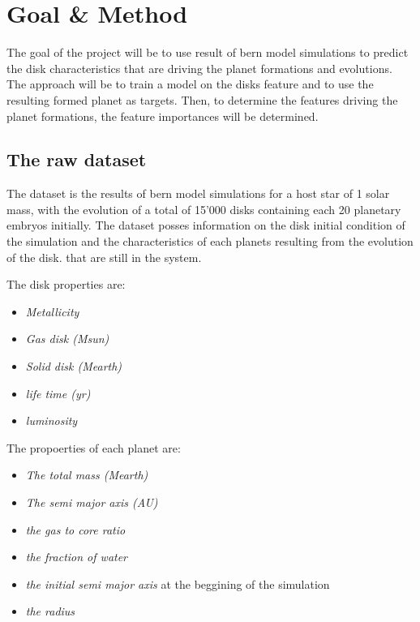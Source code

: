 \documentclass[a4paper, 11pt]{article}
\begin{document}
    \section{Goal \& Method}
    
    The goal of the project will be to use result of bern model simulations  to predict the disk characteristics that are driving the planet formations and evolutions. The approach will be to train a model on the disks feature and to use the resulting formed planet as targets. Then, to determine the features driving the planet formations, the feature importances will be determined.
    
    \subsection{The raw dataset}
    The dataset is the results of bern model simulations for a host star of 1 solar mass, with the evolution of a total of 15'000 disks containing each 20 planetary embryos initially. The dataset posses information on the disk initial condition of the simulation and the characteristics of each planets resulting from the evolution of the disk. that are still in the system.
    
    The disk properties are: 
      \begin{itemize}
      	  \setlength\itemsep{-.2em}
      	\item \textit{Metallicity}
      	\item \textit{Gas disk (Msun)}
      	\item \textit{Solid disk (Mearth)}
      	\item \textit{life time (yr)}
      	\item \textit{luminosity}
      \end{itemize}
      
    The propoerties of each planet are:
    \begin{itemize}
    	\setlength\itemsep{-.2em}
    	\item \textit{The total mass (Mearth)}
    	\item \textit{The semi major axis (AU)}
    	\item \textit{the gas to core ratio}
    	\item \textit{the fraction of water}
    	\item \textit{the initial semi major axis} at the beggining of the simulation
    	\item \textit{the radius}
    \end{itemize}
    
\end{document}
